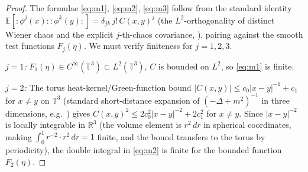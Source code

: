 \documentclass[12pt]{article}
\theoremstyle{definition}
\begin{document}
\begin{proof}
The formulae \eqref{eq:m1}, \eqref{eq:m2}, \eqref{eq:m3} follow from the standard identity
$\mathbb{E}[\colon\!\phi^j(x)\!\colon\colon\!\phi^k(y)\!\colon]=\delta_{jk}\,j!\,C(x,y)^j$
(the $L^2$-orthogonality of distinct Wiener chaos and the explicit $j$-th-chaos covariance,
\cite[Theorem~I.3]{Simon}), pairing against the smooth test functions $F_j(\eta)$.
We must verify finiteness for $j=1,2,3$.

\emph{$j=1$:} $F_1(\eta)\in C^\infty(\mathbb{T}^3)\subset L^2(\mathbb{T}^3)$, $C$ is bounded
on $L^2$, so \eqref{eq:m1} is finite.

\emph{$j=2$:} The torus heat-kernel/Green-function bound
$|C(x,y)|\le c_0|x-y|^{-1}+c_1$ for $x\ne y$ on $\mathbb{T}^3$ (standard short-distance
expansion of $(-\Delta+m^2)^{-1}$ in three dimensions, e.g.\ \cite[Lemma~3.4]{GlimmJaffe})
gives $C(x,y)^2\le 2c_0^2|x-y|^{-2}+2c_1^2$ for $x\ne y$. Since $|x-y|^{-2}$ is locally
integrable in $\mathbb{R}^3$ (the volume element is $r^2\,dr$ in spherical coordinates,
making $\int_0^1 r^{-2}\cdot r^2\,dr=1$ finite, and the bound transfers to the torus by
periodicity), the double integral in \eqref{eq:m2} is finite for the bounded function
$F_2(\eta)$.


\end{proof}
\end{document}
